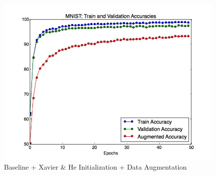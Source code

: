 \documentclass[a4paper]{article}
\begin{document}
\begin{enumerate}
{\begin{figure}[H]
  \includegraphics[width=12cm]{../plots/accuracies_augmented.jpg}
  \centering
  \caption{Baseline + Xavier \& He Initialization + Data Augmentation}
  \label{fig:boat1}
\end{figure}

}
\end{enumerate}
\end{document}
